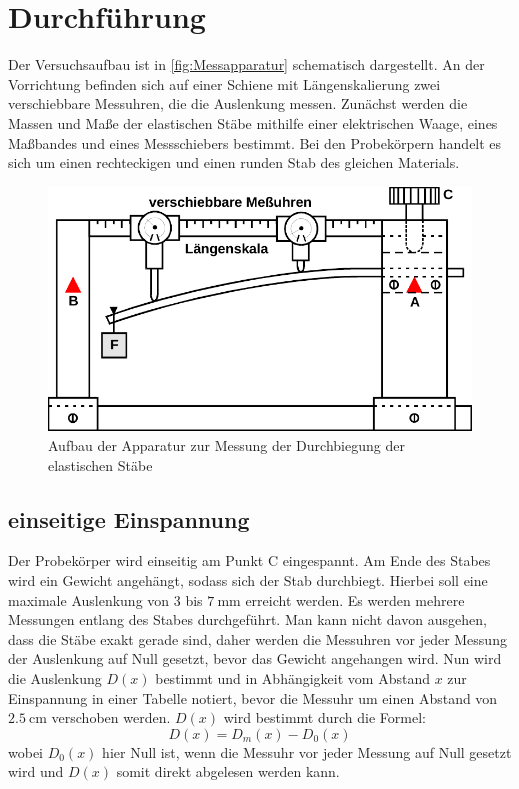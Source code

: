 \section{Durchführung}
\label{sec:Durchführung}

Der Versuchsaufbau ist in \autoref{fig:Messapparatur} schematisch dargestellt.
An der Vorrichtung befinden sich auf einer Schiene mit Längenskalierung zwei verschiebbare Messuhren, die die Auslenkung messen.
Zunächst werden die Massen und Maße der elastischen Stäbe mithilfe einer elektrischen Waage, eines Maßbandes und eines Messschiebers bestimmt.
Bei den Probekörpern handelt es sich um einen rechteckigen und einen runden Stab des gleichen Materials. 


\begin{figure}[H]
    \centering
    \includegraphics{content/Messapparat.pdf}
    \caption{Aufbau der Apparatur zur Messung der Durchbiegung der elastischen Stäbe\cite[111]{V103}}
    \label{fig:Messapparatur}
\end{figure}

\subsection{einseitige Einspannung}
Der Probekörper wird einseitig am Punkt C eingespannt. 
Am Ende des Stabes wird ein Gewicht angehängt, sodass sich der Stab durchbiegt. 
Hierbei soll eine maximale Auslenkung von $\num{3}$ bis $\qty{7}{\milli\meter}$ erreicht werden.
Es werden mehrere Messungen entlang des Stabes durchgeführt.
Man kann nicht davon ausgehen, dass die Stäbe exakt gerade sind, daher werden die Messuhren vor jeder Messung der Auslenkung auf Null gesetzt,
bevor das Gewicht angehangen wird.
Nun wird die Auslenkung $D(x)$ bestimmt und in Abhängigkeit vom Abstand $x$ zur Einspannung in einer Tabelle notiert, 
bevor die Messuhr um einen Abstand von $\qty{2,5}{\centi\meter}$ verschoben werden.
$D(x)$ wird bestimmt durch die Formel:
\begin{equation}
    D(x) = D_m(x) - D_0(x)
    \label{eqn:D(x)1}
\end{equation}
wobei $D_0(x)$ hier Null ist, wenn die Messuhr vor jeder Messung auf Null gesetzt wird und $D(x)$ somit direkt abgelesen werden kann.

